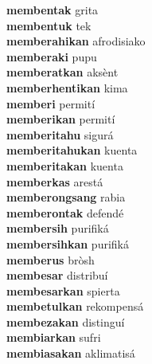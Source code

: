 \textbf{membentak } grita \\
\textbf{membentuk } tek \\
\textbf{memberahikan } afrodisiako \\
\textbf{memberaki } pupu \\
\textbf{memberatkan } aksènt \\
\textbf{memberhentikan } kima \\
\textbf{memberi } permití \\
\textbf{memberikan } permití \\
\textbf{memberitahu } sigurá \\
\textbf{memberitahukan } kuenta \\
\textbf{memberitakan } kuenta \\
\textbf{memberkas } arestá \\
\textbf{memberongsang } rabia \\
\textbf{memberontak } defendé \\
\textbf{membersih } purifiká \\
\textbf{membersihkan } purifiká \\
\textbf{memberus } bròsh \\
\textbf{membesar } distribuí \\
\textbf{membesarkan } spierta \\
\textbf{membetulkan } rekompensá \\
\textbf{membezakan } distinguí \\
\textbf{membiarkan } sufri \\
\textbf{membiasakan } aklimatisá \\
